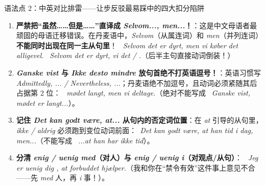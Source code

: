 \begin{grammatikbox}{语法点 2：中英对比排雷——让步反驳最易踩中的四大扣分陷阱}
\begin{enumerate}
  \item \textbf{严禁把“虽然……但是……”直译成 \textit{Selvom..., men...}！}：这是中文母语者最顽固的母语迁移错误。在丹麦语中，\textit{Selvom}（从属连词）和 \textit{men}（并列连词）\textbf{不能同时出现在同一主从句里}！\newline
    \ \textit{Selvom det er dyrt, men vi køber det alligevel.}\newline
    \ \textit{Selvom det er dyrt,  vi det  / .}（后半主句直接动词倒装！）
  \item \textbf{\textit{Ganske vist} 与 \textit{Ikke desto mindre} 放句首绝不打英语逗号！}：英语习惯写 \textit{Admittedly, ... / Nevertheless, ...}；丹麦语绝不加逗号，且动词必须紧随其后占据第 2 位：\ \textit{  mødet langt, men   vi deltage.}（绝对不能写成 \ \textit{Ganske vist, mødet er langt...}）。
  \item \textbf{记住 \textit{Det kan godt være, at...} 从句内的否定词位置}：在 \textit{at} 引导的从句里，\textit{ikke / aldrig} 必须跑到变位动词前面：\ \textit{Det kan godt være, at han  tid i dag, men...}（不能写成 \ \textit{...at han har ikke tid}）。
  \item \textbf{分清 \textit{enig / uenig med}（对人）与 \textit{enig / uenig i}（对观点/从句）}：\newline
    \ \textit{Jeg er uenig  dig , at forbuddet hjælper.}（我和你在“禁令有效”这件事上意见不合——先 \textit{med} 人，再 \textit{i} 事！）。
\end{enumerate}
\end{grammatikbox}


